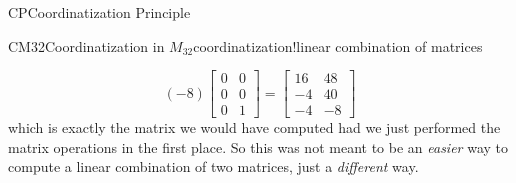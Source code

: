 \begin{subsect}{CP}{Coordinatization Principle}
\begin{example}{CM32}{Coordinatization in $M_{32}$}{coordinatization!linear combination of matrices}
\begin{para}
\begin{equation*}
(-8)\begin{bmatrix}0&0\\0&0\\0&1\end{bmatrix}
=\begin{bmatrix}16&48\\-4&40\\-4&-8\end{bmatrix}
\end{equation*}
%
which is exactly the matrix we would have computed had we just performed the matrix operations in the first place.  So this was not meant to be an {\em easier} way to compute a linear combination of two matrices, just a {\em different} way.\end{para}
%
\end{example}
%
%
\end{subsect}
%

